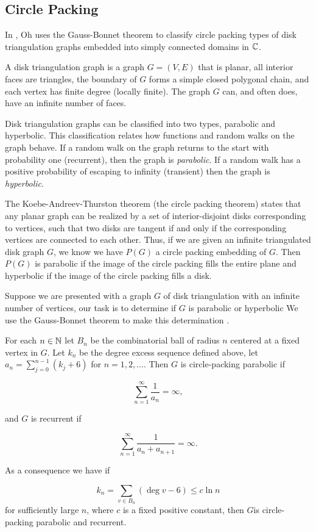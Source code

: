 \subsection{Circle Packing}
\label{sec:circle-packing}

In \cite{oh_criteria_2022}, Oh uses the Gauss-Bonnet theorem to classify
circle packing types of disk triangulation graphs embedded into simply
connected domains in $\mathbb{C}$.

A disk triangulation graph is a graph $G=(V,E)$ that is planar, all interior faces
are triangles, the boundary of $G$ forms a simple closed polygonal chain, and each
vertex has finite degree (locally finite). The graph $G$ can, and often does, have
an infinite number of faces.

Disk triangulation graphs can be classified into two types, parabolic and hyperbolic.
This classification relates how functions and random walks on the graph behave.
If a random walk on the graph returns to the start with probability one (recurrent),
then the graph is \emph{parabolic}. If a random walk has a positive probability of escaping to
infinity (transient) then the graph is \emph{hyperbolic}.

The Koebe-Andreev-Thurston theorem (the circle packing theorem) states
that any planar graph can be realized by a set of interior-disjoint disks corresponding to vertices,
such that two disks are tangent if and only if the corresponding vertices are connected
to each other. Thus, if we are given an infinite triangulated disk graph
$G$, we know we have $P(G)$ a circle packing embedding of $G$.
Then $P(G)$ is parabolic if the image of the circle packing fills the entire plane
and hyperbolic if the image of the circle packing fills a disk.

Suppose we are presented with a graph $G$ of disk triangulation with an infinite 
number of vertices, our task is to determine if $G$ is parabolic or hyperbolic
We use the Gauss-Bonnet theorem to make this determination \cite{oh_criteria_2022}.

For each $n\in\mathbb{N}$ let $B_n$ be the combinatorial ball of radius $n$
centered at a fixed vertex in $G.$ Let $k_n$ be the degree excess sequence
defined above, let $a_n=\sum_{j=0}^{n-1}(k_j+6)$ for $n=1,2,\ldots$.
Then $G$ is circle-packing parabolic if 

\begin{equation}\label{eqn:cp-parabolic}
\sum_{n=1}^{\infty}\frac{1}{a_n}=\infty,
\end{equation}

and $G$ is recurrent if

\begin{equation}\label{eqn:recurrent}
\sum_{n=1}^{\infty}\frac{1}{a_n+a_{n+1}}=\infty.
\end{equation}

As a consequence we have if

$$k_n=\sum_{v\in B_n}(\deg v -6)\leq c\ln n$$
for sufficiently large $n$, where $c$ is a fixed positive constant,
then $G$is circle-packing parabolic and recurrent.